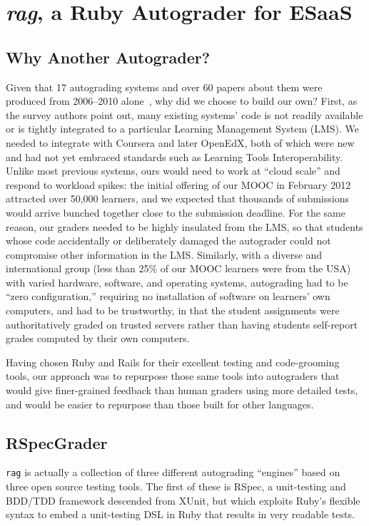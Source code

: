 \section{\emph{rag}, a Ruby Autograder for ESaaS}

\subsection{Why Another Autograder?}

Given that 17 autograding systems and over 60 papers about them were
produced from 2006--2010 alone~\cite{ihantola-2010-autograding-survey},
why did we choose to build our own?
First, as the survey authors point
out, many existing systems' code
is not readily available or is tightly integrated to a particular Learning
Management System (LMS).  We needed to integrate with Coursera and
later OpenEdX, both of which were new and had not yet embraced
standards such as Learning Tools Interoperability.
Unlike most previous 
systems, ours would need to work at ``cloud scale'' and respond to
workload spikes: the initial
offering of our MOOC in February 2012  
attracted over 50,000 learners, and we expected
that thousands of submissions would arrive bunched together close to the
submission deadline.  For the same reason, our graders needed to be
highly insulated from the LMS, so that students whose code accidentally
or deliberately damaged the autograder could not compromise other
information in the LMS.
Similarly, with a diverse and international group (less than
25\% of our MOOC learners were from the USA) with varied hardware,
software, and operating systems, autograding had to be ``zero
configuration,'' requiring no installation of software on learners' own
computers, and had to be trustworthy, in that the student
assignments were authoritatively graded on trusted servers rather than
having students self-report grades computed by their own computers.

Having chosen Ruby and Rails for their excellent testing and
code-grooming tools, our approach was to repurpose those same tools into
autograders that would give finer-grained feedback than human graders
using more detailed tests, and would be easier to repurpose than
those built for other languages.


\subsection{RSpecGrader}

\texttt{rag} 
is actually a collection of three different autograding
``engines'' based on three open source testing
tools.  The first of these is
RSpec, a unit-testing and
BDD/TDD framework descended from XUnit, but which exploits Ruby's
flexible syntax to embed a unit-testing DSL in Ruby that results in very
readable tests.  

